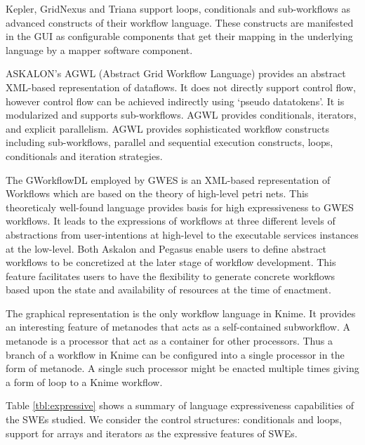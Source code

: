 Kepler, GridNexus and Triana support loops, conditionals and sub-workflows as
advanced constructs of their workflow language. These constructs are manifested
in the GUI as configurable components that get their mapping in the underlying
language by a mapper software component.

ASKALON's AGWL (Abstract Grid Workflow Language) provides an abstract XML-based
representation of dataflows. It does not directly support control flow, however
control flow can be achieved indirectly using `pseudo datatokens'. It is
modularized and supports sub-workflows. AGWL provides conditionals, iterators,
and explicit parallelism. AGWL provides sophisticated workflow constructs
including sub-workflows, parallel and sequential execution constructs, loops,
conditionals and iteration strategies.

The GWorkflowDL employed by GWES is an XML-based representation of Workflows
which are based on the theory of high-level petri nets. This theoreticaly
well-found language provides basis for high expressiveness to GWES workflows.
It leads to the expressions of workflows at three different levels of
abstractions from user-intentions at high-level to the executable services
instances at the low-level.
%
Both Askalon and Pegasus enable users to define abstract workflows to be
concretized at the later stage of workflow development. This feature
facilitates users to have the flexibility to generate concrete workflows based
upon the state and availability of resources at the time of enactment. 

The graphical representation is the only workflow language in Knime. It
provides an interesting feature of metanodes that acts as a self-contained
subworkflow. A metanode is a processor that act as a container for other
processors. Thus a branch of a workflow in Knime can be configured into a
single processor in the form of metanode. A single such processor might be
enacted multiple times giving a form of loop to a Knime workflow.

Table \ref{tbl:expressive} shows a summary of language expressiveness
capabilities of the SWEs studied. We consider the control structures:
conditionals and loops, support for arrays and iterators
\cite{montagnat-glatard-etal:2006} as the expressive features of SWEs.
